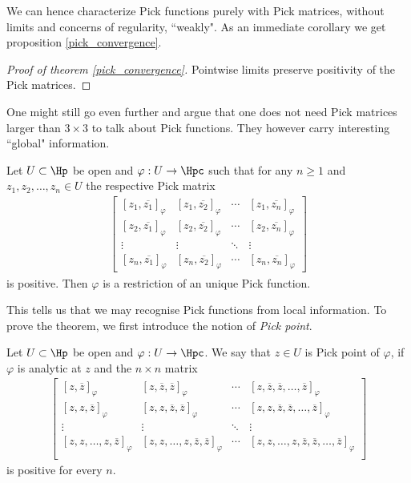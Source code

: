We can hence characterize Pick functions purely with Pick matrices, without limits and concerns of regularity, ``weakly". As an immediate corollary we get proposition \ref{pick_convergence}.

\begin{proof}[Proof of theorem \ref{pick_convergence}]
Pointwise limits preserve positivity of the Pick matrices.
\end{proof}

One might still go even further and argue that one does not need Pick matrices larger than $3 \times 3$ to talk about Pick functions. They however carry interesting ``global" information.

\begin{lause}\label{open_pick_nevanlinna}
	Let $U \subset \Hp$ be open and $\varphi : U \to \Hpc$ such that for any $n \geq 1$ and $z_{1}, z_{2}, \ldots, z_{n} \in U$ the respective Pick matrix
	\begin{align*}
	\begin{bmatrix}
		[z_{1}, \overline{z_{1}}]_{\varphi} & [z_{1}, \overline{z_{2}}]_{\varphi} & \cdots & [z_{1}, \overline{z_{n}}]_{\varphi} \\
		[z_{2}, \overline{z_{1}}]_{\varphi} & [z_{2}, \overline{z_{2}}]_{\varphi} & \cdots & [z_{2}, \overline{z_{n}}]_{\varphi} \\
		\vdots & \vdots & \ddots & \vdots \\
		[z_{n}, \overline{z_{1}}]_{\varphi} & [z_{n}, \overline{z_{2}}]_{\varphi} & \cdots &  [z_{n}, \overline{z_{n}}]_{\varphi}
	\end{bmatrix}
	\end{align*}
	is positive. Then $\varphi$ is a restriction of an unique Pick function.
\end{lause}

This tells us that we may recognise Pick functions from local information. To prove the theorem, we first introduce the notion of \textit{Pick point}.

\begin{maar}
	Let $U \subset \Hp$ be open and $\varphi : U \to \Hpc$. We say that $z \in U$ is Pick point of $\varphi$, if $\varphi$ is analytic at $z$ and the $n \times n$ matrix
	\begin{align*}
	\begin{bmatrix}
		[z, \overline{z}]_{\varphi} & [z, \overline{z}, \overline{z} ]_{\varphi} & \cdots & [z, \overline{z}, \overline{z}, \ldots, \overline{z}]_{\varphi} \\
		[z, z, \overline{z}]_{\varphi} & [z, z, \overline{z}, \overline{z} ]_{\varphi} & \cdots & [z, z, \overline{z}, \overline{z}, \ldots, \overline{z}]_{\varphi} \\
		\vdots & \vdots & \ddots & \vdots \\
		[z, z, \ldots, z, \overline{z}]_{\varphi} & [z, z, \ldots, z, \overline{z}, \overline{z} ]_{\varphi} & \cdots & [z, z, \ldots, z, \overline{z}, \overline{z}, \ldots, \overline{z}]_{\varphi} \\
	\end{bmatrix}
	\end{align*}
	is positive for every $n$.
\end{maar}

